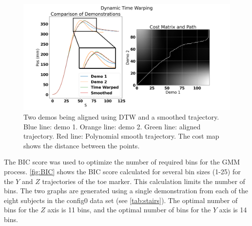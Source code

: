 \begin{figure}[h]
     \centering 
     \includegraphics[width=\textwidth]{images/stairs/DTW_annotated.png} 
     \caption[Polynomial Smoothing of DTW]{Two demos being aligned using DTW and a smoothed trajectory. Blue line: demo 1. Orange line: demo 2. Green line: aligned trajectory. Red line: Polynomial smooth trajectory. The cost map shows the distance between the points.} 
     \label{fig:DTWStairs} 
\end{figure} 



The BIC score was used to optimize the number of required bins for the GMM process. \autoref{fig:BIC} shows the BIC score calculated for several bin sizes (1-25) for the $ Y $ and $ Z $ trajectories of the toe marker. This calculation limits the number of bins. The two graphs are generated using a single demonstration from each of the eight subjects in the config0 data set (see \autoref{tab:stairs}). The optimal number of bins for the $Z$ axis is 11 bins, and the optimal number of bins for the $Y$ axis is 14 bins. 


